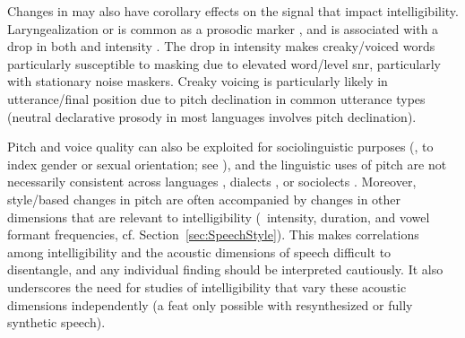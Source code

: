 Changes in \fo{} may also have corollary effects on the signal that impact intelligibility.  Laryngealization or  is common as a prosodic marker \citep{Lehiste1979, Kreiman1982, DilleyEtAl1996}, and is associated with a drop in both \fo{} and intensity \citep{GordonLadefoged2001}.  The drop in intensity makes creaky\-/voiced words particularly susceptible to masking due to elevated word\-/level \ac{snr}, particularly with stationary noise maskers.  Creaky voicing is particularly likely in utterance\-/final position due to pitch declination in common utterance types (neutral declarative prosody in most languages involves pitch declination).

Pitch and voice quality can also be exploited for sociolinguistic purposes (\ie, to index gender or sexual orientation; see \citealt[\intal]{McconnellGinet1978, Gaudio1994, Podesva2011}), and the linguistic uses of pitch are not necessarily consistent across languages \citep{MajewskiEtAl1972, Todaka1993, Yuasa2008, KeatingKuo2012}, dialects \citep{GrabePost2002, ClopperSmiljanic2011}, or sociolects \citep{McLemore1991, Britain2008}.  %
Moreover, style\-/based changes in pitch are often accompanied by changes in other dimensions that are relevant to intelligibility (\viz\ intensity, duration, and vowel formant frequencies, cf. Section~\ref{sec:SpeechStyle}).  This makes correlations among intelligibility and the acoustic dimensions of speech difficult to disentangle, and any individual finding should be interpreted cautiously.  It also underscores the need for studies of intelligibility that vary these acoustic dimensions independently (a feat only possible with resynthesized or fully synthetic speech).


